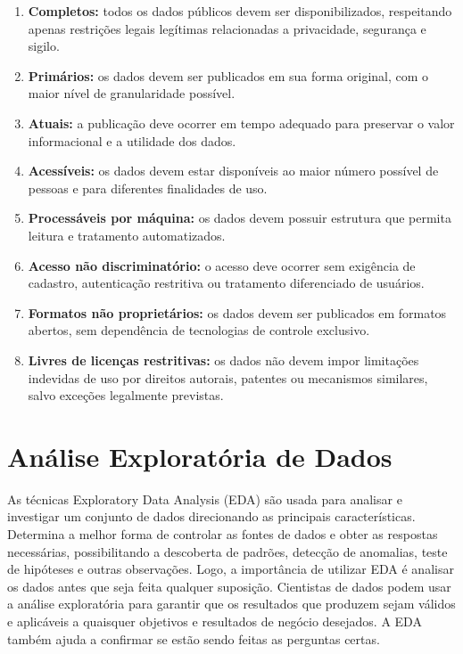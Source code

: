 \begin{enumerate}
    \item \textbf{Completos:} todos os dados públicos devem ser disponibilizados, respeitando apenas restrições legais legítimas relacionadas a privacidade, segurança e sigilo.

    \item \textbf{Primários:} os dados devem ser publicados em sua forma original, com o maior nível de granularidade possível.

    \item \textbf{Atuais:} a publicação deve ocorrer em tempo adequado para preservar o valor informacional e a utilidade dos dados.

    \item \textbf{Acessíveis:} os dados devem estar disponíveis ao maior número possível de pessoas e para diferentes finalidades de uso.

    \item \textbf{Processáveis por máquina:} os dados devem possuir estrutura que permita leitura e tratamento automatizados.

    \item \textbf{Acesso não discriminatório:} o acesso deve ocorrer sem exigência de cadastro, autenticação restritiva ou tratamento diferenciado de usuários.

    \item \textbf{Formatos não proprietários:} os dados devem ser publicados em formatos abertos, sem dependência de tecnologias de controle exclusivo.

    \item \textbf{Livres de licenças restritivas:} os dados não devem impor limitações indevidas de uso por direitos autorais, patentes ou mecanismos similares, salvo exceções legalmente previstas.
\end{enumerate}



\section{Análise Exploratória de Dados}


As técnicas Exploratory Data Analysis (EDA) são usada para analisar e investigar um conjunto de dados direcionando as principais
características. Determina a melhor forma de controlar as fontes de dados e obter as respostas
necessárias, possibilitando a descoberta de padrões, detecção de anomalias, teste de hipóteses e outras observações. Logo, a importância de utilizar EDA é analisar os dados antes que seja feita
qualquer suposição. Cientistas de dados podem usar a análise exploratória para garantir que os resultados que produzem sejam válidos e aplicáveis a quaisquer objetivos e resultados de negócio desejados. A EDA também ajuda a confirmar se estão sendo feitas as perguntas certas. \cite{ibm2021eda}


